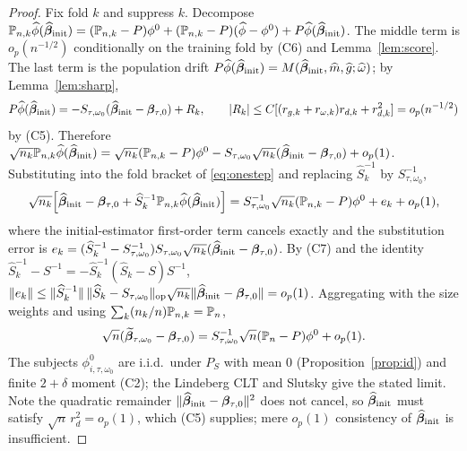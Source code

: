 \begin{proof}
Fix fold $k$ and suppress $k$. Decompose
$\mathbb{P}_{n,k}\widehat\phi(\widehat{\bm{\beta}}_{\rm init})=(\mathbb{P}_{n,k}-P)\phi^0
+(\mathbb{P}_{n,k}-P)(\widehat\phi-\phi^0)+P\widehat\phi(\widehat{\bm{\beta}}_{\rm init})$. The middle term is
$o_p(n^{-1/2})$ conditionally on the training fold by (C6) and
Lemma~\ref{lem:score}. The last term is the population drift
$P\widehat\phi(\widehat{\bm{\beta}}_{\rm init})=M(\widehat{\bm{\beta}}_{\rm init},\widehat m,\widehat g;\widehat\omega)$; by
Lemma~\ref{lem:sharp},
\[
P\widehat\phi(\widehat{\bm{\beta}}_{\rm init})=-S_{\tau,\omega_0}(\widehat{\bm{\beta}}_{\rm init}-\bm{\beta}_{\tau,0})+R_k,\qquad
|R_k|\le C[(r_{g,k}+r_{\omega,k})r_{d,k}+r_{d,k}^2]=o_p(n^{-1/2})
\]
by (C5). Therefore
$\sqrt{n_k}\mathbb{P}_{n,k}\widehat\phi(\widehat{\bm{\beta}}_{\rm init})=\sqrt{n_k}(\mathbb{P}_{n,k}-P)\phi^0
-S_{\tau,\omega_0}\sqrt{n_k}(\widehat{\bm{\beta}}_{\rm init}-\bm{\beta}_{\tau,0})+o_p(1)$. Substituting into
the fold bracket of \eqref{eq:onestep} and replacing $\widehat S_k^{-1}$ by
$S_{\tau,\omega_0}^{-1}$,
\[
\sqrt{n_k}\Big[\widehat{\bm{\beta}}_{\rm init}-\bm{\beta}_{\tau,0}+\widehat S_k^{-1}\mathbb{P}_{n,k}\widehat\phi
(\widehat{\bm{\beta}}_{\rm init})\Big]=S_{\tau,\omega_0}^{-1}\sqrt{n_k}(\mathbb{P}_{n,k}-P)\phi^0+e_k+o_p(1),
\]
where the initial-estimator first-order term cancels exactly and the
substitution error is $e_k=(\widehat S_k^{-1}-S_{\tau,\omega_0}^{-1})
S_{\tau,\omega_0}\sqrt{n_k}(\widehat{\bm{\beta}}_{\rm init}-\bm{\beta}_{\tau,0})$. By (C7) and the identity
$\widehat S_k^{-1}-S^{-1}=-\widehat S_k^{-1}(\widehat S_k-S)S^{-1}$,
$\|e_k\|\le\|\widehat S_k^{-1}\|\,\|\widehat S_k-S_{\tau,\omega_0}\|_{\rm op}
\sqrt{n_k}\|\widehat{\bm{\beta}}_{\rm init}-\bm{\beta}_{\tau,0}\|=o_p(1)$. Aggregating with the size weights
and using $\sum_k(n_k/n)\mathbb{P}_{n,k}=\mathbb{P}_n$,
\[
\sqrt n(\widetilde{\bm{\beta}}_{\tau,\omega_0}-\bm{\beta}_{\tau,0})
=S_{\tau,\omega_0}^{-1}\sqrt n(\mathbb{P}_n-P)\phi^0+o_p(1).
\]
The subjects $\phi^0_{i,\tau,\omega_0}$ are i.i.d.\ under $P_S$ with mean $0$
(Proposition~\ref{prop:id}) and finite $2+\delta$ moment (C2); the Lindeberg
CLT and Slutsky give the stated limit. Note the quadratic remainder
$\|\widehat{\bm{\beta}}_{\rm init}-\bm{\beta}_{\tau,0}\|^2$ does not cancel, so $\widehat{\bm{\beta}}_{\rm init}$ must satisfy
$\sqrt n\,r_{d}^2=o_p(1)$, which (C5) supplies; mere $o_p(1)$ consistency of
$\widehat{\bm{\beta}}_{\rm init}$ is insufficient.
\end{proof}

